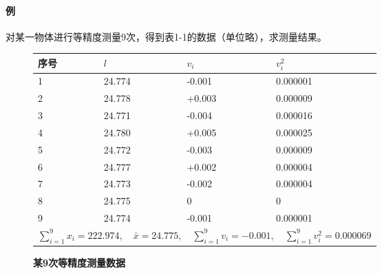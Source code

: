 \paragraph{例 } 对某一物体进行等精度测量9次，得到表1-1的数据（单位略），求测量结果。

\begin{figure}[H]
	\centering
	\captionsetup{type=table}
	\caption{\textbf{某9次等精度测量数据}}
	\begin{tabular}{|p{3cm}<{\centering}|p{3cm}<{\centering}|p{3cm}<{\centering}|p{3cm}<{\centering}|}
	\hline 
		序号	&  $ l $&  $ v_i $&  $ v_i^2 $\\	\hline 
		1&  24.774&  -0.001&  0.000001\\ \hline 
		2&  24.778&  +0.003&  0.000009\\ \hline 
		3&  24.771&  -0.004&  0.000016\\ \hline
		4&  24.780&  +0.005&  0.000025\\ \hline
		5&  24.772&  -0.003&  0.000009\\ \hline
		6&  24.777&  +0.002&  0.000004\\ \hline
		7&  24.773&  -0.002&  0.000004\\ \hline
		8&  24.775&		  0&  		 0\\ \hline
		9&  24.774&  -0.001&  0.000001\\ \hline
		\multicolumn{4}{|c|}{$ \sum\limits_{i=1}^{9}x_i=222.974,\quad\bar{x}=24.775,\quad\sum\limits_{i=1}^{9}v_i=-0.001,\quad\sum\limits_{i=1}^{9}v_i^2 =0.000069$}\\ \hline
	\end{tabular}
\end{figure}
